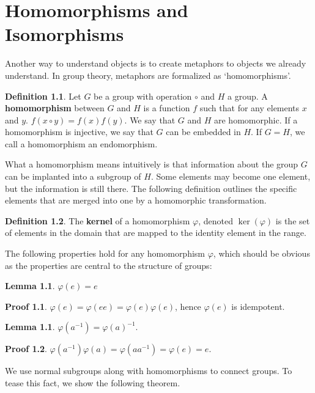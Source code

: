 \documentclass[12pt]{amsbook}
\theoremstyle{definition}
\newtheorem{lemma}[theorem]{Lemma}
\newtheorem{definition}{Definition}
\newtheorem*{prf}{Proof}
\begin{document}
\chapter{Homomorphisms and Isomorphisms}

Another way to understand objects is to create metaphors to objects we already understand. In group theory, metaphors are formalized as `homomorphisms'.

\begin{definition}
Let $G$ be a group with operation $\circ$ and $H$ a group. A {\bf homomorphism}  between $G$ and $H$ is a function $f$ such that for any elements $x$ and $y$. $f(x \circ y) = f(x) f(y)$. We say that $G$ and $H$ are homomorphic. If a homomorphism is injective, we say that $G$ can be embedded in $H$. If $G = H$, we call a homomorphism an endomorphism.
\end{definition}

What a homomorphism means intuitively is that information about the group $G$ can be implanted into a subgroup of $H$. Some elements may become one element, but the information is still there. The following definition outlines the specific elements that are merged into one by a homomorphic transformation.

\begin{definition}
    The {\bf kernel}  of a homomorphism $\varphi$, denoted $\ker(\varphi)$ is the set of elements in the domain that are mapped to the identity element in the range.
\end{definition}

The following properties hold for any homomorphism $\varphi$, which should be obvious as the properties are central to the structure of groups:

\begin{lemma} $\varphi(e) = e$ \end{lemma}
\begin{prf} $\varphi(e) = \varphi(ee) = \varphi(e)\varphi(e)$, hence $\varphi(e)$ is idempotent. \end{prf}

\begin{lemma} $\varphi(a^{-1}) = \varphi(a)^{-1}$. \end{lemma}
\begin{prf} $\varphi(a^{-1})\varphi(a) = \varphi(aa^{-1}) = \varphi(e) = e$. \end{prf}

We use normal subgroups along with homomorphisms to connect groups. To tease this fact, we show the following theorem.
\end{document}
